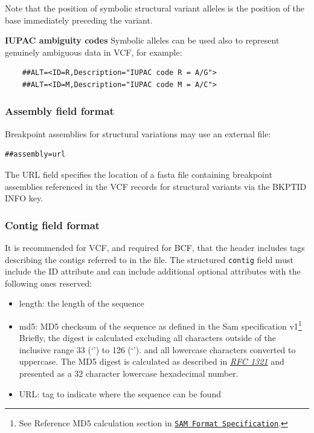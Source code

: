 \documentclass[8pt]{article}
\begin{document}
Note that the position of symbolic structural variant alleles is the position of the base immediately preceding the variant.

\bigskip

\noindent \textbf{IUPAC ambiguity codes} \newline
Symbolic alleles can be used also to represent genuinely ambiguous data in VCF, for example:
\begin{verbatim}
    ##ALT=<ID=R,Description="IUPAC code R = A/G">
    ##ALT=<ID=M,Description="IUPAC code M = A/C">
\end{verbatim}

\subsubsection{Assembly field format}
Breakpoint assemblies for structural variations may use an external file:
\begin{verbatim}
##assembly=url
\end{verbatim}

The URL field specifies the location of a fasta file containing breakpoint assemblies referenced in the VCF records for structural variants via the BKPTID INFO key.

\subsubsection{Contig field format}
\label{sec-contig-field}
It is recommended for VCF, and required for BCF, that the header includes tags describing the contigs referred to in the file.
The structured \texttt{contig} field must include the ID attribute and can include additional optional attributes with
the following ones reserved:
\begin{itemize}
  \item length: the length of the sequence
  \item md5: MD5 checksum of the sequence as defined in the Sam specification v1\footnote{See Reference MD5 calculation
      section in \href{https://samtools.github.io/hts-specs/SAMv1.pdf}{\tt SAM Format Specification}.} Briefly, the digest
      is calculated excluding all characters outside of the inclusive range 33 (`') to 126 (`').
      and all lowercase characters converted to uppercase. The MD5 digest is calculated as described in
      \href{https://tools.ietf.org/html/rfc1321}{\sl RFC 1321} and presented as a 32 character lowercase hexadecimal number.
  \item URL: tag to indicate where the sequence can be found
\end{itemize}
\end{document}

